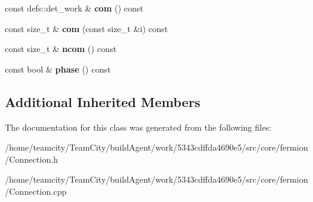 \begin{DoxyCompactItemize}
\item 
const defs\+::det\+\_\+work \& {\bfseries com} () const \hypertarget{classAntisymConnection_a7ea22c794cd53aba127c6c8f04fa4455}{}\label{classAntisymConnection_a7ea22c794cd53aba127c6c8f04fa4455}

\item 
const size\+\_\+t \& {\bfseries com} (const size\+\_\+t \&i) const \hypertarget{classAntisymConnection_a09288e7bcefd06caabefd93448322ff3}{}\label{classAntisymConnection_a09288e7bcefd06caabefd93448322ff3}

\item 
const size\+\_\+t \& {\bfseries ncom} () const \hypertarget{classAntisymConnection_a458ecaa28eb699e7b9594e73e81780be}{}\label{classAntisymConnection_a458ecaa28eb699e7b9594e73e81780be}

\item 
const bool \& {\bfseries phase} () const \hypertarget{classAntisymConnection_aefb3cefa46b0fe2c9b58f47d795ce1de}{}\label{classAntisymConnection_aefb3cefa46b0fe2c9b58f47d795ce1de}

\end{DoxyCompactItemize}
\subsection*{Additional Inherited Members}


The documentation for this class was generated from the following files\+:\begin{DoxyCompactItemize}
\item 
/home/teamcity/\+Team\+City/build\+Agent/work/5343cdffda4690e5/src/core/fermion/Connection.\+h\item 
/home/teamcity/\+Team\+City/build\+Agent/work/5343cdffda4690e5/src/core/fermion/Connection.\+cpp\end{DoxyCompactItemize}
